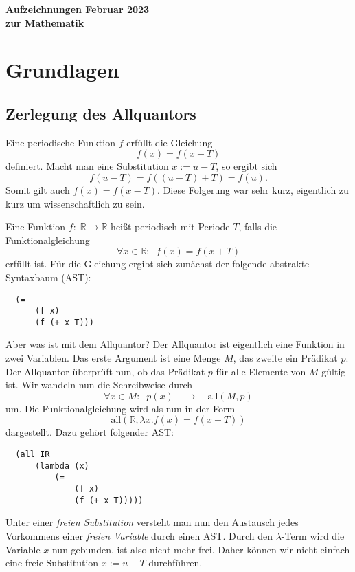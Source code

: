 \documentclass[a4paper,10pt,fleqn,twocolumn,twoside,dvipdfmx]{scrartcl}
\numberwithin{equation}{section}
\theoremstyle{rmbox}
\begin{document}
\noindent
{\LARGE\sffamily\bfseries Aufzeichnungen
{\mdseries\rmfamily\large\hfill Februar 2023}\\[-2pt]
zur Mathematik\par}


\tableofcontents

\section{Grundlagen}
\subsection{Zerlegung des Allquantors}
Eine periodische Funktion $f$ erfüllt die Gleichung
\begin{equation}
f(x) = f(x+T)
\end{equation}
definiert. Macht man eine Substitution $x:=u-T$, so ergibt sich
\begin{equation}
f(u-T) = f((u-T)+T) = f(u).
\end{equation}
Somit gilt auch $f(x)=f(x-T)$. Diese Folgerung war sehr kurz,
eigentlich zu kurz um wissenschaftlich zu sein.

Eine Funktion $f{:}\;\mathbb R\rightarrow\mathbb R$
heißt periodisch mit Periode $T$, falls die
Funktionalgleichung
\begin{equation}
\forall x{\in}\mathbb R{:}\;\; f(x) = f(x+T)
\end{equation}
erfüllt ist. Für die Gleichung ergibt sich zunächst
der folgende abstrakte Syntaxbaum (AST):
\begin{verbatim}
  (=
      (f x)
      (f (+ x T)))
\end{verbatim}
Aber was ist mit dem Allquantor? Der Allquantor ist eigentlich
eine Funktion in zwei Variablen. Das erste Argument ist eine Menge $M$,
das zweite ein Prädikat $p$. Der Allquantor überprüft nun, ob das
Prädikat $p$ für alle Elemente von $M$ gültig ist. Wir wandeln nun
die Schreibweise durch
\begin{equation}
\forall x{\in}M{:}\;\; p(x)\quad\longrightarrow\quad
\mathrm{all}(M,p)
\end{equation}
um. Die Funktionalgleichung wird als nun in der Form
\begin{equation}\label{periodisch-all}
\mathrm{all}(\mathbb R,\lambda x. f(x) = f(x+T))
\end{equation}
dargestellt. Dazu gehört folgender AST:
\begin{verbatim}
  (all IR
      (lambda (x)
          (=
              (f x)
              (f (+ x T)))))
\end{verbatim}
Unter einer \textit{freien Substitution} versteht man nun den
Austausch jedes Vorkommens einer \textit{freien Variable}
durch einen AST. Durch den $\lambda$-Term wird die
Variable $x$ nun gebunden, ist also nicht mehr frei.
Daher können wir nicht einfach eine freie Substitution
$x{:=}u{-}T$ durchführen.
\end{document}
